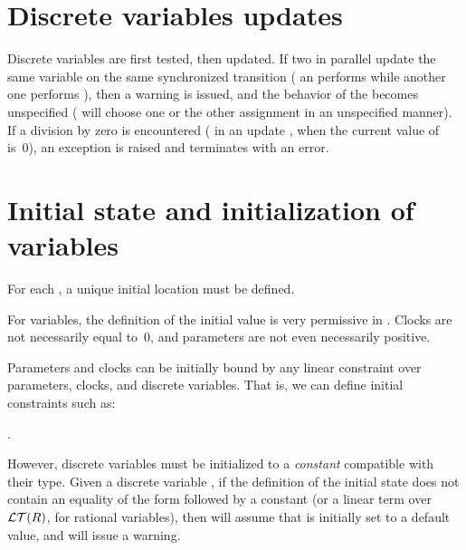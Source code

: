 \section{Discrete variables updates}\label{section:discrete_boolean}

Discrete variables are first tested, then updated.
If two \IPTA{} in parallel update the same variable on the same synchronized transition (\eg{} an \IPTA{} performs  while another one performs ), then a warning is issued, and the behavior of the \NIPTA{} becomes unspecified (\ie{} \imitator{} will choose one or the other assignment in an unspecified manner).
If a division by zero is encountered (\eg{} in an update , when the current value of~ is~0), an exception is raised and \imitator{} terminates with an error.

\section{Initial state and initialization of variables}\label{section:init}

For each \IPTA{}, a unique initial location must be defined.

For variables, the definition of the initial value is very permissive in \imitator{}.
Clocks are not necessarily equal to~0, and parameters are not even necessarily positive.

Parameters and clocks can be initially bound by any linear constraint over parameters, clocks, and discrete variables.
That is, we can define initial constraints such as:
\begin{center}
	.
\end{center}

However, discrete variables must be initialized to a \emph{constant} compatible with their type.
Given a discrete variable , if the definition of the initial state does not contain an equality of the form  followed by a constant (or a linear term over~$\mathcal{LT}(R)$, for rational variables), then \imitator{} will assume that  is initially set to a default value, and will issue a warning.

